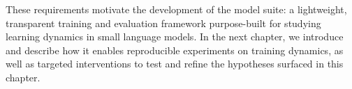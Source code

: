 These requirements motivate the development of the \pico model suite: a lightweight, transparent training and evaluation framework purpose-built for studying learning dynamics in small language models. In the next chapter, we introduce \pico and describe how it enables reproducible experiments on training dynamics, as well as targeted interventions to test and refine the hypotheses surfaced in this chapter.

